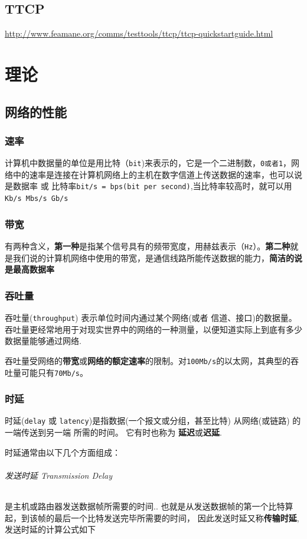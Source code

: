 \documentclass[UTF8,a4paper,12pt]{ctexbook}
\begin{document}
	\section{TTCP}
		\url{http://www.feamane.org/comms/testtools/ttcp/ttcp-quickstartguide.html}
	
\chapter{理论}
	\section{网络的性能}
		\subsection{速率} 计算机中数据量的单位是用比特（\verb|bit|)来表示的，它是一个二进制数，\verb|0或者1|，网络中的速率是连接在计算机网络上的主机在数字信道上传送数据的速率，也可以说是数据率 或 比特率\verb|bit/s = bps(bit per second)|,当比特率较高时，就可以用\verb|Kb/s Mbs/s Gb/s|
		
		\subsection{带宽} 有两种含义，\textbf{第一种}是指某个信号具有的频带宽度，用赫兹表示（\verb|Hz|）。\textbf{第二种}就是我们说的计算机网络中使用的带宽，是通信线路所能传送数据的能力，\textbf{简洁的说是最高数据率}
		
		\subsection{吞吐量} 吞吐量(\verb|throughput|) 表示单位时间内通过某个网络(或者 信道、接口)的数据量。 吞吐量更经常地用于对现实世界中的网络的一种测量，以便知道实际上到底有多少数据量能够通过网络.
		
			吞吐量受网络的\textbf{带宽}或\textbf{网络的额定速率}的限制。对\verb|100Mb/s|的以太网，其典型的吞吐量可能只有\verb|70Mb/s|。
			
		\subsection{时延} 时延(\verb|delay| 或 \verb|latency|)是指数据(一个报文或分组，甚至比特) 从网络(或链路) 的一端传送到另一端 所需的时间。 它有时也称为 \textbf{延迟}或\textbf{迟延}.
			
			时延通常由以下几个方面组成：
			\subparagraph{发送时延 Transmission Delay} 是主机或路由器发送数据帧所需要的时间.. 也就是从发送数据帧的第一个比特算起，到该帧的最后一个比特发送完毕所需要的时间， 因此发送时延又称\textbf{传输时延},发送时延的计算公式如下
			
\end{document}
